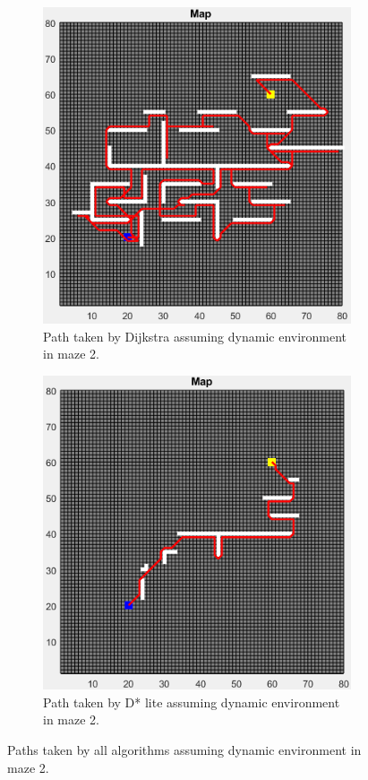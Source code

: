 \begin{figure}
\begin{subfigure}[t]{0.32\columnwidth}
		\includegraphics[width=\textwidth]{images/dijkstra_dynamic_maze_2.png}
		\caption{Path taken by Dijkstra assuming dynamic environment in maze 2.}
        \label{fig:dijkstra_dynamic_path_maze_2}
	\end{subfigure}
    \hfill
    \begin{subfigure}[t]{0.32\columnwidth}
		\centering
		\includegraphics[width=\textwidth]{images/d_star_lite_dynamic_maze_2.png}
		\caption{Path taken by D* lite assuming dynamic environment in maze 2.}
        \label{fig:d_star_dynamic_path_maze_2}
	\end{subfigure}
	\caption{Paths taken by all algorithms assuming dynamic environment in maze 2.}
    \label{fig:dynamic_path_maze_2}
\end{figure}

